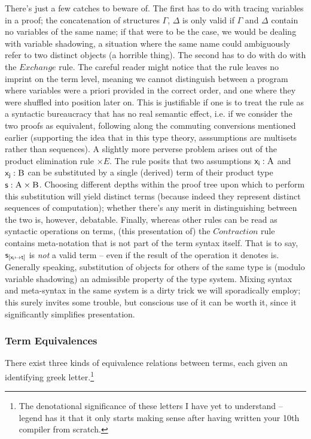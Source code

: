 There's just a few catches to beware of.
The first has to do with tracing variables in a proof; the concatenation of structures $\Gamma$, $\Delta$ is only valid if $\Gamma$ and $\Delta$ contain no variables of the same name; if that were to be the case, we would be dealing with variable shadowing, a situation where the same name could ambiguously refer to two distinct objects (a horrible thing).
The second has to do with do with the $Exchange$ rule. 
The careful reader might notice that the rule leaves no imprint on the term level, meaning we cannot distinguish between a program where variables were a priori provided in the correct order, and one where they were shuffled into position later on.
This is justifiable if one is to treat the rule as a syntactic bureaucracy that has no real semantic effect, i.e. if we consider the two proofs as equivalent, following along the commuting conversions mentioned earlier (supporting the idea that in this type theory, asssumptions are multisets rather than sequences).
A slightly more perverse problem arises out of the product elimination rule $\times E$.
The rule posits that two assumptions $\term{x_i}: \prop{A}$ and $\term{x_j}: \prop{B}$ can be substituted by a single (derived) term of their product type $\term{s}: \prop{A}\times\prop{B}$. 
Choosing different depths within the proof tree upon which to perform this substitution will yield distinct terms (because indeed they represent distinct sequences of computation); whether there's any merit in distinguishing between the two is, however, debatable.
Finally, whereas other rules can be read as syntactic operations on terms, (this presentation of) the $Contraction$ rule contains meta-notation that is not part of the term syntax itself.
That is to say, $\mathsf{s}_{[\mathsf{x_i} \mapsto \mathsf{t}]}$ is \textit{not} a valid term -- even if the result of the operation it denotes is.
Generally speaking, substitution of objects for others of the same type is (modulo variable shadowing) an admissible property of the type system.
Mixing syntax and meta-syntax in the same system is a dirty trick we will sporadically employ; this surely invites some trouble, but conscious use of it can be worth it, since it significantly simplifies presentation.

\subsubsection{Term Equivalences}
There exist three kinds of equivalence relations between terms, each given an identifying greek letter.\footnote{The denotational significance of these letters I have yet to understand -- legend has it that it only starts making sense after having written your 10th compiler from scratch.}

